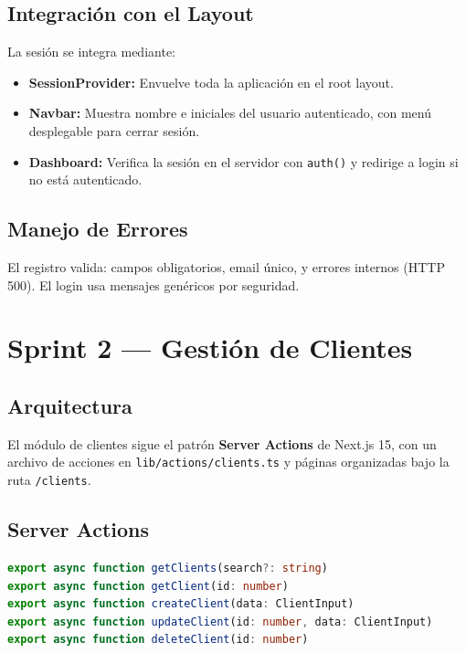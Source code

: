 \documentclass[12pt,a4paper]{article}
\begin{document}
\subsection{Integración con el Layout}

La sesión se integra mediante:

\begin{itemize}[leftmargin=*]
    \item \textbf{SessionProvider:} Envuelve toda la aplicación en el root layout.
    \item \textbf{Navbar:} Muestra nombre e iniciales del usuario autenticado,
          con menú desplegable para cerrar sesión.
    \item \textbf{Dashboard:} Verifica la sesión en el servidor con \texttt{auth()}
          y redirige a login si no está autenticado.
\end{itemize}

\subsection{Manejo de Errores}

El registro valida: campos obligatorios, email único, y errores internos
(HTTP 500). El login usa mensajes genéricos por seguridad.

\section{Sprint 2 --- Gestión de Clientes}

\subsection{Arquitectura}

El módulo de clientes sigue el patrón \textbf{Server Actions} de Next.js 15,
con un archivo de acciones en \texttt{lib/actions/clients.ts} y páginas
organizadas bajo la ruta \texttt{/clients}.

\subsection{Server Actions}

\begin{lstlisting}[language=TypeScript, caption=API de server actions para clientes]
export async function getClients(search?: string)
export async function getClient(id: number)
export async function createClient(data: ClientInput)
export async function updateClient(id: number, data: ClientInput)
export async function deleteClient(id: number)
\end{lstlisting}
\end{document}

